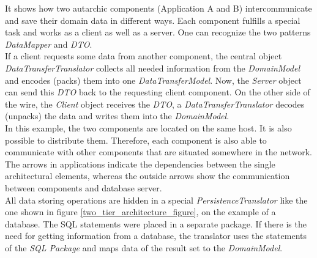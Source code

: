 It shows how two autarchic components (Application A and B) intercommunicate and
save their domain data in different ways. Each component fulfills a special task
and works as a client as well as a server. One can recognize the two patterns
\emph{DataMapper} and \emph{DTO}.\\
If a client requests some data from another component, the central object
\emph{DataTransferTranslator} collects all needed information from the
\emph{DomainModel} and encodes (packs) them into one \emph{DataTransferModel}.
Now, the \emph{Server} object can send this \emph{DTO} back to the requesting
client component. On the other side of the wire, the \emph{Client} object receives
the \emph{DTO}, a \emph{DataTransferTranslator} decodes (unpacks) the data and
writes them into the \emph{DomainModel}.\\
In this example, the two components are located on the same host. It is also
possible to distribute them. Therefore, each component is also able to communicate
with other components that are situated somewhere in the network. The arrows in
applications indicate the dependencies between the single architectural elements,
whereas the outside arrows show the communication between components and database
server.\\
All data storing operations are hidden in a special \emph{PersistenceTranslator}
like the one shown in figure \ref{two_tier_architecture_figure}, on the example
of a database. The SQL statements were placed in a separate package. If there is
the need for getting information from a database, the translator uses the statements
of the \emph{SQL Package} and maps data of the result set to the \emph{DomainModel}.

